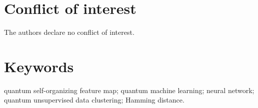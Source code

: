 \documentclass[pra,showkeys,twocolumn,showpacs]{revtex4-1}
\begin{document}





\section*{Conflict of interest}

The authors declare no conflict of interest.


\section*{Keywords}
quantum self-organizing feature map; quantum machine learning; neural network; quantum unsupervised data clustering; Hamming distance.




\end{document}
